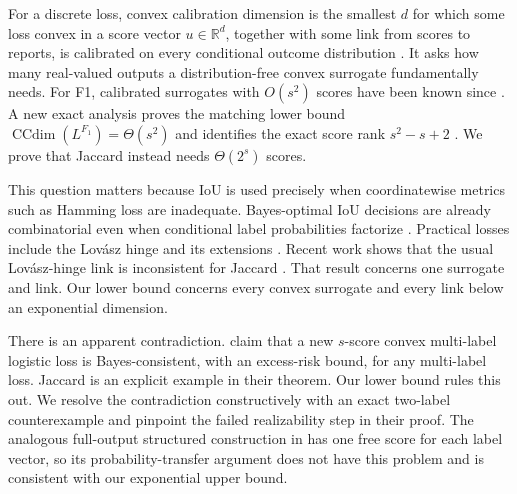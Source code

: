\documentclass{article}
\newcommand{\R}{\mathbb R}
\newcommand{\1}{\mathbf 1}
\newcommand{\CCdim}{\operatorname{CCdim}}
\begin{document}
For a discrete loss, convex calibration dimension is the smallest $d$ for which some loss convex in a score vector $u\in\R^d$, together with some link from scores to reports, is calibrated on every conditional outcome distribution \citep{ramaswamy2016ccdim}. It asks how many real-valued outputs a distribution-free convex surrogate fundamentally needs. For F1, calibrated surrogates with $O(s^2)$ scores have been known since \citet{zhang2020fmeasure}. A new exact analysis proves the matching lower bound $\CCdim(L^{F_1})=\Theta(s^2)$ and identifies the exact score rank $s^2-s+2$ \citep{zhang2026exact}. We prove that Jaccard instead needs $\Theta(2^s)$ scores.

This question matters because IoU is used precisely when coordinatewise metrics such as Hamming loss are inadequate. Bayes-optimal IoU decisions are already combinatorial even when conditional label probabilities factorize \citep{nowozin2014iou}. Practical losses include the Lov\'asz hinge and its extensions \citep{yu2018lovasz,berman2018lovasz}. Recent work shows that the usual Lov\'asz-hinge link is inconsistent for Jaccard \citep{finocchiaro2025lovasz}. That result concerns one surrogate and link. Our lower bound concerns every convex surrogate and every link below an exponential dimension.

There is an apparent contradiction. \citet{mao2024multilabel} claim that a new $s$-score convex multi-label logistic loss is Bayes-consistent, with an excess-risk bound, for any multi-label loss. Jaccard is an explicit example in their theorem. Our lower bound rules this out. We resolve the contradiction constructively with an exact two-label counterexample and pinpoint the failed realizability step in their proof. The analogous full-output structured construction in \citet{mao2023structured} has one free score for each label vector, so its probability-transfer argument does not have this problem and is consistent with our exponential upper bound.
\end{document}
